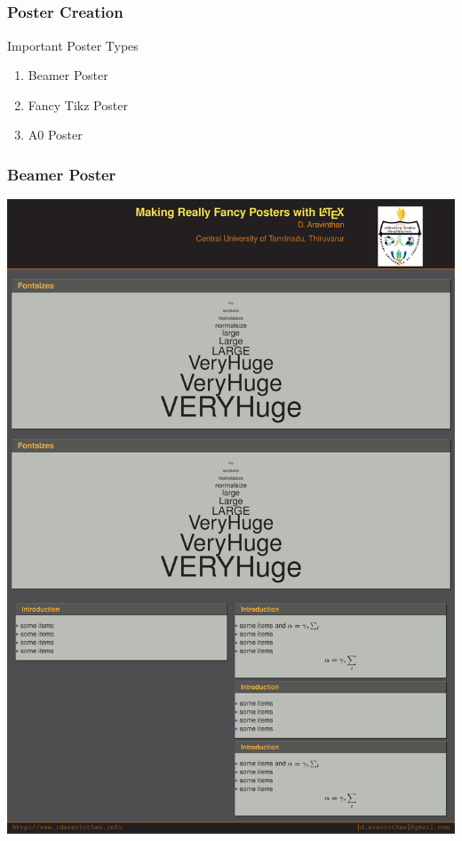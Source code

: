 \documentclass[[newPxFont]{beamer}
\begin{document}
\subsection{}
\begin{frame}
\frametitle{Poster Creation}
\begin{block}{Important Poster Types}
\begin{enumerate}
  \item Beamer Poster
  \pause
  \item Fancy Tikz Poster
  \pause
  \item A0 Poster
\end{enumerate}
\end{block}

\end{frame}
\begin{frame}[fragile=singleslide]
  \frametitle{Beamer Poster}
\begin{center}
\includegraphics[scale=0.06]{figs/example}
\end{center}
\end{frame}
\end{document}
